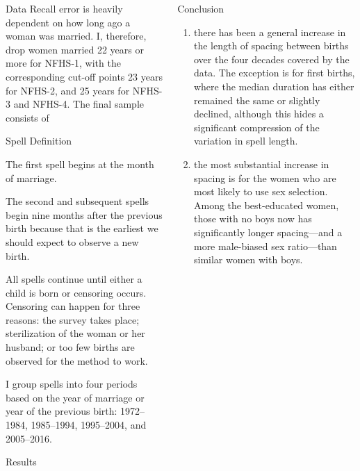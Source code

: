 \documentclass[final]{beamer}
\newlength{\onecolwid}
\newlength{\twocolwid}
\begin{document}
\begin{frame}{}
\begin{columns}[t]
\begin{column}{\twocolwid}
\begin{block}{Data}
Recall error is heavily dependent on how long ago a woman was married.
I, therefore, drop women married 22 years or more 
for NFHS-1, with the corresponding cut-off points 23 years for NFHS-2, 
and 25 years for NFHS-3 and NFHS-4.
The final sample consists of 


\end{block}

\begin{block}{Spell Definition}

The first spell begins at the month of marriage.

The second and subsequent spells begin nine months after the previous birth 
because that is the earliest we should expect to observe a new birth.

All spells continue until either a child is born or censoring occurs.
Censoring can happen for three reasons:
the survey takes place;
sterilization of the woman or her husband;
or too few births are observed for the method to work.

I group spells into four periods based on the year of marriage
or year of the previous birth:
1972--1984, 1985--1994, 1995--2004, and 2005--2016.

\end{block}

\begin{block}{Results}

\end{block}


\end{column}


\begin{column}{\onecolwid}

\begin{block}{Conclusion}

\begin{enumerate}
\item there has been a general increase in the length of spacing between births
over the four decades covered by the data.
The exception is for first births, where the median duration has either
remained the same or slightly declined, although this hides a
significant compression of the variation in spell length.

\item the most substantial increase in spacing is for the women who
are most likely to use sex selection.
Among the best-educated women, those with no boys now has 
significantly longer spacing---and a more male-biased sex ratio---than 
similar women with boys.


\end{enumerate}
\end{block}
\end{column}
\end{columns}
\end{frame}
\end{document}
